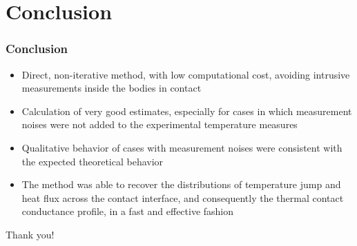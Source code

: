 \documentclass[aspectratio=169]{beamer}
\begin{document}
\section{Conclusion}
\begin{frame}
	\frametitle{Conclusion}
	\begin{itemize}
		\item Direct, non-iterative method, with low computational cost, avoiding intrusive measurements inside the bodies in contact		
	\pause
		\item Calculation of very good estimates, especially for cases in which measurement noises were not added to the experimental temperature measures
	\pause
		\item Qualitative behavior of cases with measurement noises were consistent with the expected theoretical behavior
	\pause
		\item The method was able to recover the distributions of temperature jump and heat flux across the contact interface, and consequently the thermal contact conductance profile, in a fast and effective fashion
	\end{itemize}
\end{frame}

\begin{frame}
	\centering
	Thank you!
\end{frame}

	
\end{document}
